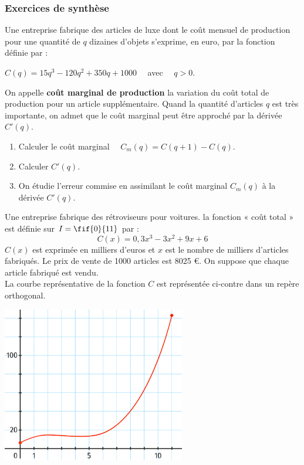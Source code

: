 \documentclass[a4paper,11pt,exos]{nsi} %
\begin{document}
\subsubsection*{Exercices de synthèse}
Une entreprise fabrique des articles de luxe dont le coût mensuel de production pour une quantité de $q$ dizaines d'objets s'exprime, en euro, par la fonction définie par :
\begin{center}
	$C(q)=15q^3-120q^2+350q+1000\quad$ avec $\quad q>0$.
\end{center}
On appelle \textbf{coût marginal de production} la variation du coût total de production pour un article supplémentaire. Quand la quantité d'articles $q$ est très importante, on admet que le coût marginal peut être approché par la dérivée $C'(q)$.
\begin{enumerate}
	\item 	Calculer le coût marginal $\quad C_m(q)=C(q+1)-C(q)$.
	\item 	Calculer $C'(q)$.
	\item	On étudie l'erreur commise en assimilant le coût marginal $C_m(q)$ à la dérivée $C'(q)$.
\end{enumerate}	



\exo{}
\begin{minipage}{8cm}
	Une entreprise fabrique des rétroviseurs pour voitures. la fonction « coût total » est définie sur $I=\fif{0}{11}$ par :
	 $$C(x)=0,3x^3-3x^2+9x+6$$
	$C(x)$ est exprimée en milliers d'euros et $x$ est le nombre de milliers d'articles fabriqués. Le prix de vente de 1000 articles est 8025 €. On suppose que chaque article fabriqué est vendu.\\
	La courbe représentative de la fonction $C$ est représentée ci-contre dans un repère orthogonal.
\end{minipage}
\begin{minipage}{9cm}
	\begin{center}
		\includegraphics[width=8cm]{retroviseurs}
	\end{center}
\end{minipage}
\end{document}
